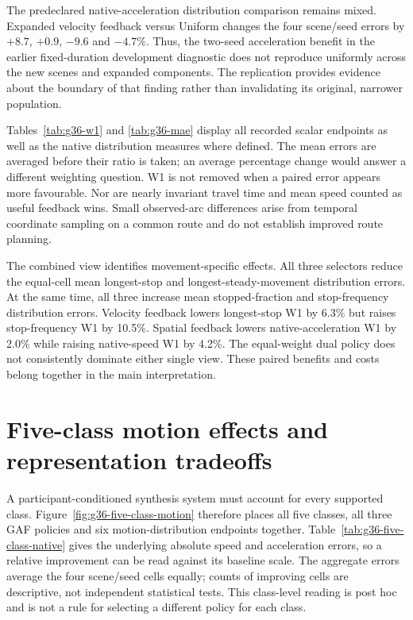The predeclared native-acceleration distribution comparison remains mixed. Expanded velocity feedback versus Uniform changes the four scene/seed errors by $+8.7$, $+0.9$, $-9.6$ and $-4.7\%$. Thus, the two-seed acceleration benefit in the earlier fixed-duration development diagnostic does not reproduce uniformly across the new scenes and expanded components. The replication provides evidence about the boundary of that finding rather than invalidating its original, narrower population.





Tables~\ref{tab:g36-w1} and \ref{tab:g36-mae} display all recorded scalar endpoints as well as the native distribution measures where defined. The mean errors are averaged before their ratio is taken; an average percentage change would answer a different weighting question. W1 is not removed when a paired error appears more favourable. Nor are nearly invariant travel time and mean speed counted as useful feedback wins. Small observed-arc differences arise from temporal coordinate sampling on a common route and do not establish improved route planning.

The combined view identifies movement-specific effects. All three selectors reduce the equal-cell mean longest-stop and longest-steady-movement distribution errors. At the same time, all three increase mean stopped-fraction and stop-frequency distribution errors. Velocity feedback lowers longest-stop W1 by 6.3\% but raises stop-frequency W1 by 10.5\%. Spatial feedback lowers native-acceleration W1 by 2.0\% while raising native-speed W1 by 4.2\%. The equal-weight dual policy does not consistently dominate either single view. These paired benefits and costs belong together in the main interpretation.

\FloatBarrier
\section{Five-class motion effects and representation tradeoffs}
\label{sec:exploratory-stopping}
A participant-conditioned synthesis system must account for every supported class. Figure~\ref{fig:g36-five-class-motion} therefore places all five classes, all three GAF policies and six motion-distribution endpoints together. Table~\ref{tab:g36-five-class-native} gives the underlying absolute speed and acceleration errors, so a relative improvement can be read against its baseline scale. The aggregate errors average the four scene/seed cells equally; counts of improving cells are descriptive, not independent statistical tests. This class-level reading is post hoc and is not a rule for selecting a different policy for each class.

